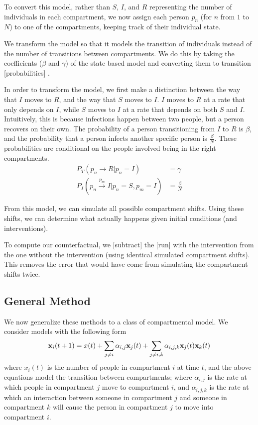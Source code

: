 \documentclass{article}
\renewcommand{\vec}[1]{{\textbf #1}}
\begin{document}
To convert this model, rather than $S$, $I$, and $R$ representing the number of individuals in each compartment, we now assign each person $p_n$ (for $n$ from $1$ to $N$) to one of the compartments, keeping track of their individual state.

We transform the model so that it models the transition of individuals instead of the number of transitions between compartments.  We do this by taking the coefficients ($\beta$ and $\gamma$) of the state based model and converting them to transition [probabilities] %
.

In order to transform the model, we first make a distinction between the way that $I$ moves to $R$, and the way that $S$ moves to $I$.  $I$ moves to $R$ at a rate that only depends on $I$, while $S$ moves to $I$ at a rate that depends on both $S$ and $I$.  Intuitively, this is because infections happen between two people, but a person recovers on their own.  The probability of a person transitioning from $I$ to $R$ is $\beta$, and the probability that a person infects another specific person is $\frac{\beta}{N}$.  These probabilities are conditional on the people involved being in the right compartments.
\begin{align*}
   P_T(p_n \rightarrow R \vert p_n = I) &= \gamma
\\ P_I(p_n \xrightarrow{p_m} I  \vert p_n = S, p_m = I) &= \frac{\beta}{N}
\end{align*}

From this model, we can simulate all possible compartment shifts. %
Using these shifts, we can determine what actually happens given initial conditions (and interventions). %

To compute our counterfactual, we [subtract] the [run] with the intervention from the one without the intervention (using identical simulated compartment shifts).  This removes the error that would have come from simulating the compartment shifts twice.

\subsection*{General Method}

We now generalize these methods to a class of compartmental model.  We consider models with the following form
\begin{align*}
\vec{x}_i(t+1) = x(t) + \sum_{j \neq i} \alpha_{i,j} \vec{x}_j(t) +  \sum_{j \neq i,k} \alpha_{i,j,k} \vec{x}_j(t) \vec x_k(t)
\end{align*}
where $x_i(t)$ is the number of people in compartment $i$ at time $t$, and the above equations model the transition between compartments; where $\alpha_{i,j}$ is the rate at which people in compartment $j$ move to compartment $i$, and $\alpha_{i,j,k}$ is the rate at which an interaction between someone in compartment $j$ and someone in compartment $k$ will cause the person in compartment $j$ to move into compartment $i$.
\end{document}
